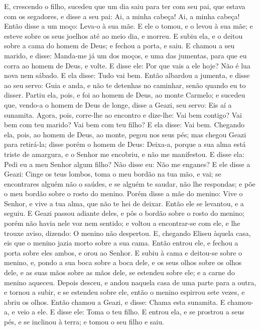 E, crescendo o filho, sucedeu que um dia saiu para ter com seu
pai, que estava com os segadores, e disse a seu pai: Ai, a
minha cabeça! Ai, a minha cabeça! Então disse a um moço: Leva-o à
sua mãe. E ele o tomou, e o levou à sua mãe; e esteve sobre
os seus joelhos até ao meio dia, e morreu. E subiu ela, e o
deitou sobre a cama do homem de Deus; e fechou a porta, e saiu.
E chamou a seu marido, e disse: Manda-me já um dos moços, e
uma das jumentas, para que eu corra ao homem de Deus, e volte.
E disse ele: Por que vais a ele hoje? Não é lua nova nem
sábado. E ela disse: Tudo vai bem. Então albardou a jumenta,
e disse ao seu servo: Guia e anda, e não te detenhas no caminhar,
senão quando eu to disser. Partiu ela, pois, e foi ao homem
de Deus, ao monte Carmelo; e sucedeu que, vendo-a o homem de Deus de
longe, disse a Geazi, seu servo: Eis aí a sunamita. Agora,
pois, corre-lhe ao encontro e dize-lhe: Vai bem contigo? Vai bem com
teu marido? Vai bem com teu filho? E ela disse: Vai bem.
Chegando ela, pois, ao homem de Deus, ao monte, pegou nos
seus pés; mas chegou Geazi para retirá-la; disse porém o homem de
Deus: Deixa-a, porque a sua alma está triste de amargura, e o Senhor
me encobriu, e não me manifestou. E disse ela: Pedi eu a meu
Senhor algum filho? Não disse eu: Não me enganes? E ele disse
a Geazi: Cinge os teus lombos, toma o meu bordão na tua mão, e vai;
se encontrares alguém não o saúdes, e se alguém te saudar, não lhe
respondas; e põe o meu bordão sobre o rosto do menino. Porém
disse a mãe do menino: Vive o Senhor, e vive a tua alma, que não te
hei de deixar. Então ele se levantou, e a seguiu. E Geazi
passou adiante deles, e pôs o bordão sobre o rosto do menino; porém
não havia nele voz nem sentido; e voltou a encontrar-se com ele, e
lhe trouxe aviso, dizendo: O menino não despertou. E,
chegando Eliseu àquela casa, eis que o menino jazia morto sobre a
sua cama. Então entrou ele, e fechou a porta sobre eles
ambos, e orou ao Senhor. E subiu à cama e deitou-se sobre o
menino, e, pondo a sua boca sobre a boca dele, e os seus olhos sobre
os olhos dele, e as suas mãos sobre as mãos dele, se estendeu sobre
ele; e a carne do menino aqueceu. Depois desceu, e andou
naquela casa de uma parte para a outra, e tornou a subir, e se
estendeu sobre ele, então o menino espirrou sete vezes, e abriu os
olhos. Então chamou a Geazi, e disse: Chama esta sunamita. E
chamou-a, e veio a ele. E disse ele: Toma o teu filho. E
entrou ela, e se prostrou a seus pés, e se inclinou à terra; e tomou
o seu filho e saiu.

